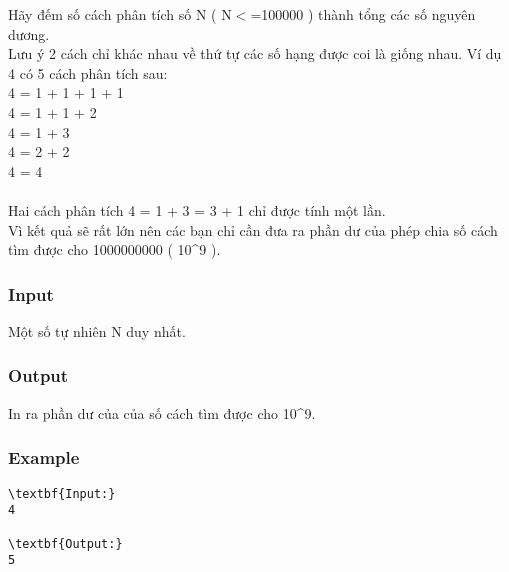 



   Hãy đếm số cách phân tích số N ( N$<$=100000 ) thành tổng các số nguyên dương.   
\\   Lưu ý 2 cách chỉ khác nhau về thứ tự các số hạng được coi là giống nhau. Ví dụ 4 có 5 cách phân tích sau:   
\\   4 = 1 + 1 + 1 + 1   
\\   4 = 1 + 1 + 2   
\\   4 = 1 + 3   
\\   4 = 2 + 2   
\\   4 = 4   
\\
\\   Hai cách phân tích 4 = 1 + 3 = 3 + 1 chỉ được tính một lần.   
\\   Vì kết quả sẽ rất lớn nên các bạn chỉ cần đưa ra phần dư của phép chia số cách tìm được cho 1000000000 ( 10\textasciicircum9 ).  

\subsubsection{   Input  }

   Một số tự nhiên N duy nhất.  

\subsubsection{   Output  }

   In ra phần dư của của số cách tìm được cho 10\textasciicircum9.  

\subsubsection{   Example  }
\begin{verbatim}
\textbf{Input:}
4

\textbf{Output:}
5
\end{verbatim}